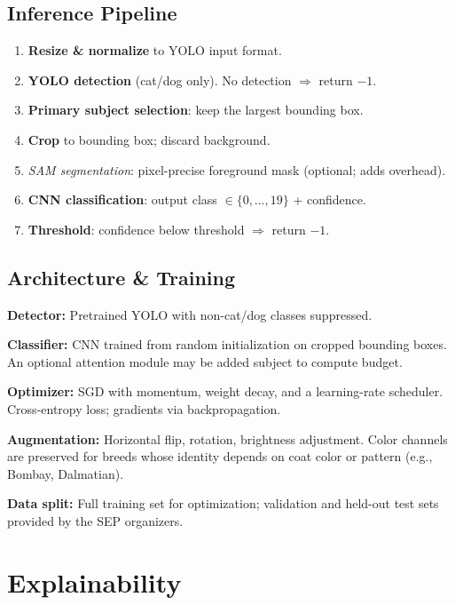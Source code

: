 \documentclass[10pt,twocolumn,letterpaper]{article}
\begin{document}
\subsection{Inference Pipeline}

\begin{enumerate}[leftmargin=*, topsep=1pt, itemsep=1pt, parsep=0pt]
  \item \textbf{Resize \& normalize} to YOLO input format.
  \item \textbf{YOLO detection} (cat/dog only). No detection $\Rightarrow$ return $-1$.
  \item \textbf{Primary subject selection}: keep the largest bounding box.
  \item \textbf{Crop} to bounding box; discard background.
  \item[\textit{opt.}] \textit{SAM segmentation}: pixel-precise foreground mask (optional; adds overhead).
  \item \textbf{CNN classification}: output class $\in\{0,\ldots,19\}$ + confidence.
  \item \textbf{Threshold}: confidence below threshold $\Rightarrow$ return $-1$.
\end{enumerate}

\subsection{Architecture \& Training}

\textbf{Detector:} Pretrained YOLO with non-cat/dog classes suppressed.

\textbf{Classifier:} CNN trained from random initialization on cropped bounding boxes. An optional attention module may be added subject to compute budget.

\textbf{Optimizer:} SGD with momentum, weight decay, and a learning-rate scheduler. Cross-entropy loss; gradients via backpropagation.

\textbf{Augmentation:} Horizontal flip, rotation, brightness adjustment. Color channels are preserved for breeds whose identity depends on coat color or pattern (e.g., Bombay, Dalmatian).

\textbf{Data split:} Full training set for optimization; validation and held-out test sets provided by the SEP organizers.

\section{Explainability}
\label{sec:xai}
\end{document}

